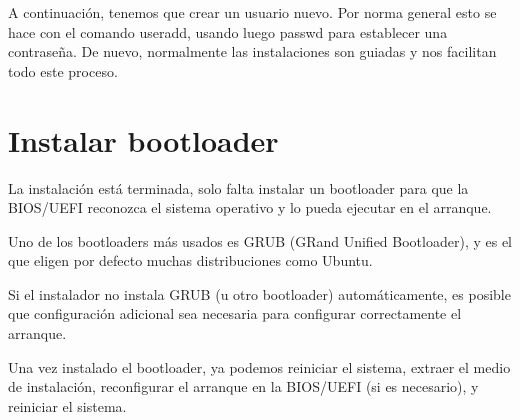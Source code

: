 A continuación, tenemos que crear un usuario nuevo. Por norma general esto se hace con el comando useradd, usando luego passwd para establecer una contraseña.
De nuevo, normalmente las instalaciones son guiadas y nos facilitan todo este proceso.

\section{Instalar bootloader}
La instalación está terminada, solo falta instalar un bootloader para que la BIOS/UEFI reconozca el sistema operativo y lo pueda ejecutar en el arranque.

Uno de los bootloaders más usados es GRUB (GRand Unified Bootloader), y es el que eligen por defecto muchas distribuciones como Ubuntu.

Si el instalador no instala GRUB (u otro bootloader) automáticamente, es posible que configuración adicional sea necesaria para configurar correctamente el arranque.

Una vez instalado el bootloader, ya podemos reiniciar el sistema, extraer el medio de instalación, reconfigurar el arranque en la BIOS/UEFI (si es necesario), y reiniciar el sistema.
